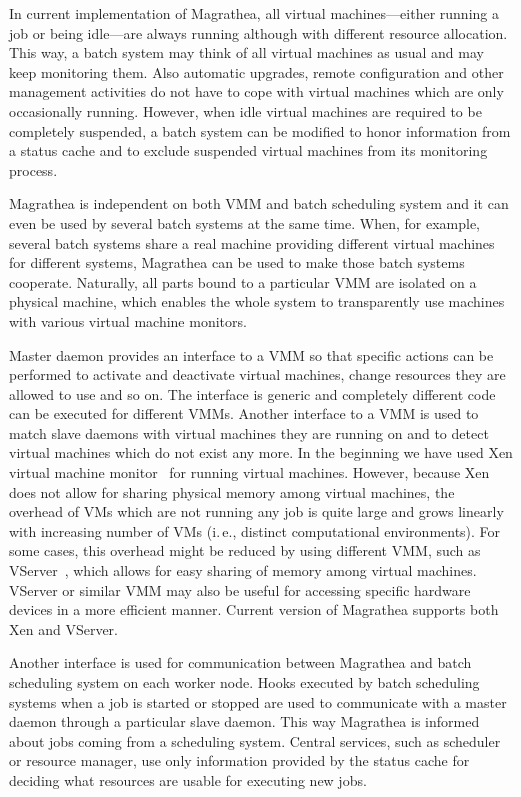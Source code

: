 \documentclass{sigplanconf}
\begin{document}
In current implementation of Magrathea, all virtual machines---either running
a job or being idle---are always running although with different resource
allocation. This way, a batch system may think of all virtual machines as
usual and may keep monitoring them. Also automatic upgrades, remote
configuration and other management activities do not have to cope with virtual
machines which are only occasionally running. However, when idle virtual
machines are required to be completely suspended, a batch system can be
modified to honor information from a status cache and to exclude suspended
virtual machines from its monitoring process.

Magrathea is independent on both VMM and batch scheduling system and it can
even be used by several batch systems at the same time. When, for example,
several batch systems share a real machine providing different virtual
machines for different systems, Magrathea can be used to make those batch
systems cooperate. Naturally, all parts bound to a particular VMM are isolated
on a physical machine, which enables the whole system to transparently use
machines with various virtual machine monitors.

Master daemon provides an interface to a VMM so that specific actions can be
performed to activate and deactivate virtual machines, change resources they
are allowed to use and so on. The interface is generic and completely
different code can be executed for different VMMs. Another interface to a VMM
is used to match slave daemons with virtual machines they are running on and
to detect virtual machines which do not exist any more. In the beginning we
have used Xen virtual machine monitor~\cite{xen} for running virtual machines.
However, because Xen does not allow for sharing physical memory among virtual
machines, the overhead of VMs which are not running any job is quite large and
grows linearly with increasing number of VMs (i.\,e., distinct computational
environments). For some cases, this overhead might be reduced by using
different VMM, such as VServer~\cite{vserver}, which allows for easy sharing
of memory among virtual machines. VServer or similar VMM may also be useful
for accessing specific hardware devices in a more efficient manner. Current
version of Magrathea supports both Xen and VServer.

Another interface is used for communication between Magrathea and batch
scheduling system on each worker node. Hooks executed by batch scheduling
systems when a job is started or stopped are used to communicate with a master
daemon through a particular slave daemon. This way Magrathea is informed about
jobs coming from a scheduling system. Central services, such as scheduler or
resource manager, use only information provided by the status cache for
deciding what resources are usable for executing new jobs.
\end{document}
